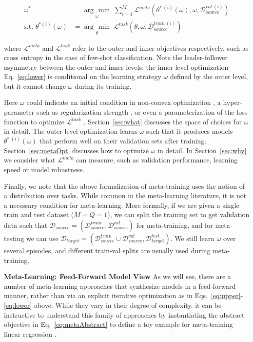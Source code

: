 \documentclass[10pt,journal,compsoc]{IEEEtran}
\newcommand{\keypoint}[1]{\vspace{0.1cm}\noindent\textbf{#1}\quad}
\newcommand{\argmin}[1]{\underset{#1}{\operatorname{arg}\,\operatorname{min}}\;}
\begin{document}
\begin{align}
 \omega^* &= \argmin{\omega} \sum^M_{i=1}\mathcal{L}^{meta}(\theta^{*~(i)}(\omega), \omega, \mathcal{D}^{val~(i)}_{source})\label{eq:upper}\\
 \text{s.t. }\theta^{*(i)}(\omega) &= \argmin{{\theta}}\mathcal{L}^{task}(\theta, \omega, \mathcal{D}^{train~(i)}_{source})\label{eq:lower}
\end{align}

\noindent where $\mathcal{L}^{meta}$ and $\mathcal{L}^{task}$ refer to the outer and inner objectives respectively, such as cross entropy in the case of few-shot classification. Note the leader-follower asymmetry between the outer and inner levels: the inner level optimization Eq.~\ref{eq:lower} is conditional on the learning strategy $\omega$ defined by the outer level, but it cannot change $\omega$ during its training.


Here $\omega$ could indicate an initial condition in non-convex optimization \cite{finn2017maml}, a hyper-parameter such as regularization strength \cite{franceschi2018bilevel}, or even a parameterization of the loss function to optimize $\mathcal{L}^{task}$ \cite{li2019featurecritic}. Section~\ref{sec:what} discusses the space of choices for $\omega$ in detail. The outer level optimization learns $\omega$ such that it produces models $\theta^{*~(i)}(\omega)$ that perform well on their validation sets after training. Section~\ref{sec:metaOpt} discusses how to optimize $\omega$ in detail. In Section~\ref{sec:why} we consider what $\mathcal{L}^{meta}$ can measure, such as validation performance, learning speed or model robustness.

Finally, we note that the above formalization of meta-training uses the notion of a distribution over tasks. While common in the meta-learning literature, it is not a necessary condition for meta-learning. More formally, if we are given a single train and test dataset ($M=Q=1$), we can split the training set to get validation data such that $\mathscr{D}_{source} = (\mathcal{D}^{train}_{source}, \mathcal{D}^{val}_{source})$ for meta-training, and for meta-testing we can use $\mathscr{D}_{target} = (\mathcal{D}^{train}_{source} \cup \mathcal{D}^{val}_{source}, \mathcal{D}^{test}_{target})$. We still learn $\omega$ over several episodes, and different train-val splits are usually used during meta-training.

\keypoint{Meta-Learning: Feed-Forward Model View} As we will see, there are a number of meta-learning approaches that synthesize models in a feed-forward manner, rather than via an explicit iterative optimization as in Eqs.~\ref{eq:upper}-\ref{eq:lower} above. While they vary in their degree of complexity, it can be instructive to understand this family of approaches by instantiating the abstract objective in Eq.~\ref{eq:metaAbstract} to define a toy example for meta-training linear regression \cite{denevi2018l2lmean}. 
\end{document}
